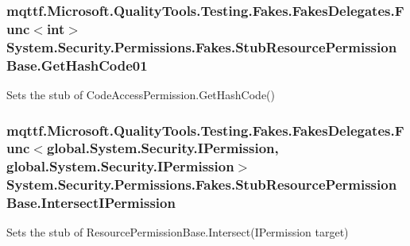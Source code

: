\hypertarget{class_system_1_1_security_1_1_permissions_1_1_fakes_1_1_stub_resource_permission_base_a010701b9028e73aeda4835510f53b3dc}{
\subsubsection[{Get\-Hash\-Code01}]{\setlength{\rightskip}{0pt plus 5cm}mqttf.\-Microsoft.\-Quality\-Tools.\-Testing.\-Fakes.\-Fakes\-Delegates.\-Func$<$int$>$ System.\-Security.\-Permissions.\-Fakes.\-Stub\-Resource\-Permission\-Base.\-Get\-Hash\-Code01}}\label{class_system_1_1_security_1_1_permissions_1_1_fakes_1_1_stub_resource_permission_base_a010701b9028e73aeda4835510f53b3dc}


Sets the stub of Code\-Access\-Permission.\-Get\-Hash\-Code()

\hypertarget{class_system_1_1_security_1_1_permissions_1_1_fakes_1_1_stub_resource_permission_base_a0cd916e15a65e1ad0f475c979e255f8f}{
\subsubsection[{Intersect\-I\-Permission}]{\setlength{\rightskip}{0pt plus 5cm}mqttf.\-Microsoft.\-Quality\-Tools.\-Testing.\-Fakes.\-Fakes\-Delegates.\-Func$<$global.\-System.\-Security.\-I\-Permission, global.\-System.\-Security.\-I\-Permission$>$ System.\-Security.\-Permissions.\-Fakes.\-Stub\-Resource\-Permission\-Base.\-Intersect\-I\-Permission}}\label{class_system_1_1_security_1_1_permissions_1_1_fakes_1_1_stub_resource_permission_base_a0cd916e15a65e1ad0f475c979e255f8f}


Sets the stub of Resource\-Permission\-Base.\-Intersect(\-I\-Permission target)

